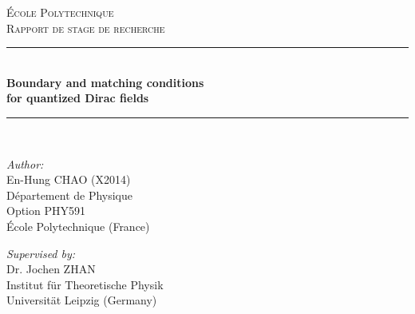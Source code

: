 
\begin{titlepage}

\newcommand{\HRule}{\rule{\linewidth}{0.5mm}} %

\center %
 

\textsc{\LARGE {\'E}cole Polytechnique  }\\[0.3cm] %
\textsc{\Large Rapport de stage de recherche}\\[0.5cm] %


\HRule \\[0.4cm]
{ \huge \bfseries Boundary and matching conditions \\ for quantized Dirac fields}\\[0.03cm] %
\HRule \\[1.5cm]

 

\begin{minipage}{0.4\textwidth}
\begin{flushleft} \large
\emph{Author:}\\
En-Hung CHAO (X2014)  \\D{\'e}partement de Physique\\ Option PHY591 \\ {\'E}cole Polytechnique (France)%
~
\end{flushleft}
\end{minipage}
\begin{minipage}{0.4\textwidth}
\begin{flushright} \large
\emph{Supervised by:} \\
Dr. Jochen ZHAN\\Institut f{\"u}r Theoretische Physik\\Universit{\"a}t Leipzig (Germany) %
\end{flushright}
\end{minipage}\\[1cm]


\end{titlepage}
